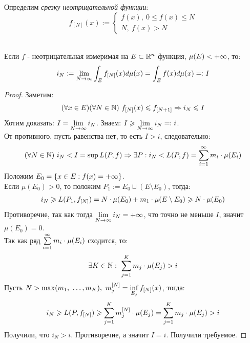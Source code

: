 \begin{definition}
	Определим \textit{срезку неотрицательной функции}:
	\[
	f_{[N]}(x):=
	\begin{cases}
		f(x),\ 0\le f(x)\le N\\
		N,\ f(x)>N
	\end{cases}
	\]
\end{definition}
\begin{theorem}\label{12th2}\\
	Если $f$ - неотрицательная измеримая на $E\subset\mathbb{R}^n$ функция, $\mu(E)<{+\infty}$, то:
	\[i_N:=\lim_{N\ra\i}\int_Ef_{[N]}(x)d\mu(x)=\int_Ef(x)d\mu(x)=:I\]
\end{theorem}
\begin{proof}
	Заметим:
	\[(\forall x\in E)(\forall N\in\mathbb{N})\ {f_{[{N}]}}(x)\leqslant {f_{[{N+1}]}}\Rightarrow i_N\leqslant I\]
	Хотим доказать: $I=\lim_{N\ra\i}i_N$. Знаем: $I\ge \lim_{N\ra\i}i_N=:i$.\\
	От противного, пусть равенства нет, то есть $I>i$, следовательно:
	\[(\fa N\in\N)\ i_N<I=\sup L(P,f)\Ra\ex P:i_N<L(P,f)=\sum_{i=1}^\i m_i\cdot\mu(E_i)\]
	Положим $E_0=\{x\in E:f(x)={+\infty}\}$. \\
	Если $\mu(E_0)>0$, то положим $P_1:=E_0\sqcup(E\setminus E_0)$, тогда:
	\[i_N\geqslant L(P_1,{f_{[{N}]}})=N\cdot\mu(E_0)+m_1\cdot\mu(E\setminus E_0)\geqslant N\cdot\mu(E_0)\]
	Противоречие, так как тогда $\lim_{N\ra\i}i_N=\p$, что точно не меньше $I$, значит $\mu(E_0)=0$.\\
	Так как ряд $\sum_{i=1}^\i m_i\cdot\mu(E_i)$ сходится, то:
	\[\ex K\in\N:\ \sum_{j=1}^Km_j\cdot\mu(E_j)>i\]
	Пусть $N>\max(m_1,\ \dots,m_K),\ m_j^{[N]}=\inf_{E_j}\sr(x)$, тогда:
	\[i_N\ge L(P,\sr)\ge\sum_{j=1}^Km_j^{[N]}\cdot\mu(E_j)=\sum_{j=1}^Km_j\cdot\mu(E_j)>i\]
	Получили, что $i_N>i$. Противоречие, а значит $I=i$. Получили требуемое.
\end{proof}